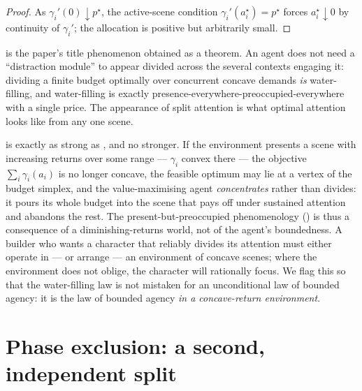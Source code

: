 \documentclass[11pt,twocolumn,a4paper]{article}
\newcommand{\price}{p^{\star}}       %
\begin{document}
\begin{proof}
As $\gamma_i'(0)\downarrow\price$, the active-scene condition
$\gamma_i'(a_i^\star)=\price$ forces $a_i^\star\downarrow0$ by continuity
of $\gamma_i'$; the allocation is positive but arbitrarily small.
\end{proof}

\begin{remark}
\label{rem:split}
 is the paper's title phenomenon obtained as a
theorem. An agent does not need a ``distraction module'' to appear divided
across the several contexts engaging it: dividing a finite budget
optimally over concurrent concave demands \emph{is} water-filling, and
water-filling is exactly presence-everywhere-preoccupied-everywhere with a
single price. The appearance of split attention is what optimal attention
looks like from any one scene.
\end{remark}

\begin{remark}
\label{rem:nonconcave}
 is exactly as strong as , and no
stronger. If the environment presents a scene with increasing returns over
some range --- $\gamma_i$ convex there --- the objective
$\sum_i\gamma_i(a_i)$ is no longer concave, the feasible optimum may lie at
a vertex of the budget simplex, and the value-maximising agent
\emph{concentrates} rather than divides: it pours its whole budget into the
scene that pays off under sustained attention and abandons the rest. The
present-but-preoccupied phenomenology () is thus a
consequence of a diminishing-returns world, not of the agent's boundedness.
A builder who wants a character that reliably divides its attention must
either operate in --- or arrange --- an environment of concave scenes; where
the environment does not oblige, the character will rationally focus. We
flag this so that the water-filling law is not mistaken for an unconditional
law of bounded agency: it is the law of bounded agency \emph{in a
concave-return environment}.
\end{remark}

\section{Phase exclusion: a second, independent split}
\label{sec:phases}
\end{document}
